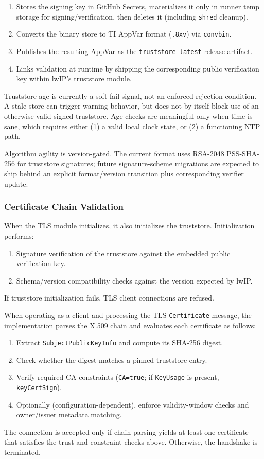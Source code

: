 \documentclass[titlepage]{report}
\begin{document}
\begin{enumerate}
		\item Stores the signing key in GitHub Secrets, materializes it only in runner temp storage for signing/verification, then deletes it (including \texttt{shred} cleanup).
		\item Converts the binary store to TI AppVar format (\texttt{.8xv}) via \texttt{convbin}.
		\item Publishes the resulting AppVar as the \texttt{truststore-latest} release artifact.
		\item Links validation at runtime by shipping the corresponding public verification key within lwIP's truststore module.
	\end{enumerate}
	
	Truststore age is currently a soft-fail signal, not an enforced rejection condition. A stale store can trigger warning behavior, but does not by itself block use of an otherwise valid signed truststore. Age checks are meaningful only when time is sane, which requires either (1) a valid local clock state, or (2) a functioning NTP path.
	
	Algorithm agility is version-gated. The current format uses RSA-2048 PSS-SHA-256 for truststore signatures; future signature-scheme migrations are expected to ship behind an explicit format/version transition plus corresponding verifier update.
	
	\subsubsection{Certificate Chain Validation}
	When the TLS module initializes, it also initializes the truststore. Initialization performs:
	\begin{enumerate}
		\item Signature verification of the truststore against the embedded public verification key.
		\item Schema/version compatibility checks against the version expected by lwIP.
	\end{enumerate}
	If truststore initialization fails, TLS client connections are refused.
	
	When operating as a client and processing the TLS \texttt{Certificate} message, the implementation parses the X.509 chain and evaluates each certificate as follows:
	\begin{enumerate}
		\item Extract \texttt{SubjectPublicKeyInfo} and compute its SHA-256 digest.
		\item Check whether the digest matches a pinned truststore entry.
		\item Verify required CA constraints (\texttt{CA=true}; if \texttt{KeyUsage} is present, \texttt{keyCertSign}).
		\item Optionally (configuration-dependent), enforce validity-window checks and owner/issuer metadata matching.
	\end{enumerate}
	The connection is accepted only if chain parsing yields at least one certificate that satisfies the trust and constraint checks above. Otherwise, the handshake is terminated.
	
\end{document}
